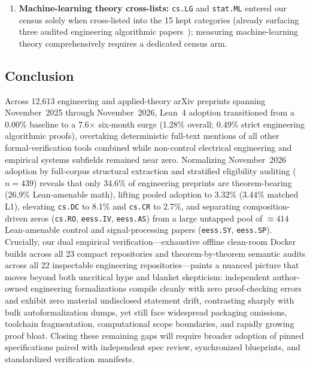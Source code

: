 \documentclass[11pt,letterpaper]{article}
\begin{document}
\begin{enumerate}
  \item \textbf{Machine-learning theory cross-lists:} \texttt{cs.LG} and \texttt{stat.ML} entered our census solely when cross-listed into the 15 kept categories (already surfacing three audited engineering algorithmic papers~\cite{arxiv2611_05243,arxiv2611_18455,arxiv2611_14586}); measuring machine-learning theory comprehensively requires a dedicated census arm.
\end{enumerate}

\subsection{Conclusion}
Across 12,613 engineering and applied-theory arXiv preprints spanning November~2025 through November~2026, Lean~4 adoption transitioned from a 0.00\% baseline to a 7.6$\times$ six-month surge (1.28\% overall; 0.49\% strict engineering algorithmic proofs), overtaking deterministic full-text mentions of all other formal-verification tools combined while non-control electrical engineering and empirical systems subfields remained near zero. Normalizing November~2026 adoption by full-corpus structural extraction and stratified eligibility auditing ($n = 439$) reveals that only 34.6\% of engineering preprints are theorem-bearing (26.9\% Lean-amenable math), lifting pooled adoption to 3.32\% (3.44\% matched L1), elevating \texttt{cs.DC} to 8.1\% and \texttt{cs.CR} to 2.7\%, and separating composition-driven zeros (\texttt{cs.RO}, \texttt{eess.IV}, \texttt{eess.AS}) from a large untapped pool of $\approx 414$ Lean-amenable control and signal-processing papers (\texttt{eess.SY}, \texttt{eess.SP}). Crucially, our dual empirical verification---exhaustive offline clean-room Docker builds across all 23 compact repositories and theorem-by-theorem semantic audits across all 22 inspectable engineering repositories---paints a nuanced picture that moves beyond both uncritical hype and blanket skepticism: independent author-owned engineering formalizations compile cleanly with zero proof-checking errors and exhibit zero material undisclosed statement drift, contrasting sharply with bulk autoformalization dumps, yet still face widespread packaging omissions, toolchain fragmentation, computational scope boundaries, and rapidly growing proof bloat. Closing these remaining gaps will require broader adoption of pinned specifications paired with independent spec review, synchronized blueprints, and standardized verification manifests.

\end{document}

